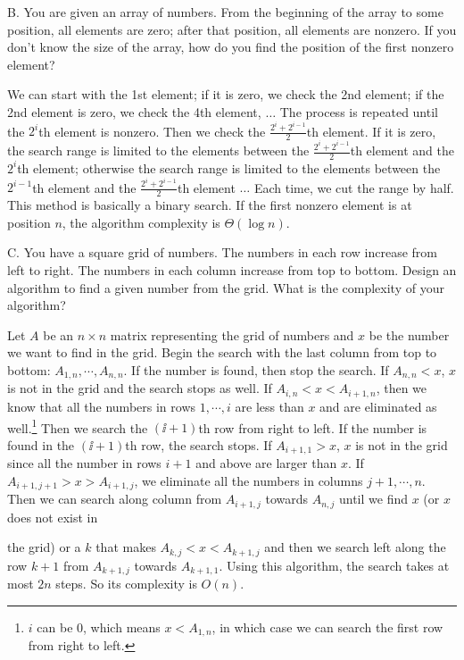 \begin{problem}{B. You are given an array of numbers. From the beginning of the array to some position, all elements are zero; after that position, all elements are nonzero. If you don't know the size of the array, how do you find the position of the first nonzero element?}
\end{problem}

\begin{solution}
We can start with the 1st element; if it is zero, we check the 2nd element; if the 2nd
element is zero, we check the 4th element, $\ldots$ The process is repeated until the $2^i$th
element is nonzero. Then we check the $\frac{2^i+2^{i-1}}{2}$th element. If it is zero, the search range is limited to the elements between the
$\frac{2^i+2^{i-1}}{2}$th element and the $2^i$th element; otherwise the search range is
limited to the elements between the $2^{i-1}$th element and the
$\frac{2^i+2^{i-1}}{2}$th element $\ldots$ Each time, we cut the range by half. This method is
basically a binary search. If the first nonzero element is at position $n$, the algorithm
complexity is $\Theta(\log n)$.

\end{solution}

\begin{problem}{C. You have a square grid of numbers. The numbers in each row increase from left to right. The numbers in each column increase from top to bottom. Design an algorithm to find a given number from the grid. What is the complexity of your algorithm?}
\end{problem}

\begin{solution}
Let $A$ be an $n\times n$ matrix representing the grid of numbers and $x$ be the number we
want to find in the grid. Begin the search with the last column from top to bottom:
$A_{1,n},\cdots,A_{n,n}$. If the number is found, then stop the search. If $A_{n,n}<x$, $x$ is
not in the grid and the search stops as well. If $A_{i,n}<x<A_{i+1,n}$, then we know that all
the numbers in rows $1,\cdots,i$ are less than $x$ and are eliminated as well.\footnote[6]{$i$ can be 0, which means $x<A_{1,n}$, in which case we can search the first row from right to left.} Then we search the $(\ii+1)$th row from right to left. If the number is found in the $(\ii+1)$th row, the search stops. If $A_{i+1,1}>x$, $x$ is not in the grid since all the number in rows $i+1$ and above are larger than $x$. If $A_{i+1,j+1}>x>A_{i+1,j}$, we eliminate all the numbers in columns $j+1,\cdots,n$. Then we can search along column from $A_{i+1,j}$ towards $A_{n,j}$ until we find $x$ (or $x$ does not exist in


the grid) or a $k$ that makes $A_{k,j}<x<A_{k+1,j}$ and then we search left along the row $k+1$
from $A_{k+1,j}$ towards $A_{k+1,1}$. Using this algorithm, the search takes at most $2n$
steps. So its complexity is $O(n)$.\qedhere

\end{solution}


